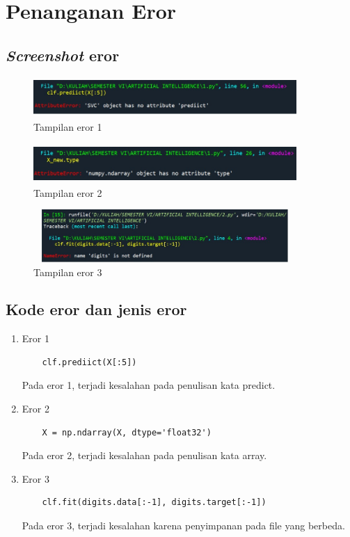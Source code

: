 \documentclass{article}
\begin{document}
\section{Penanganan Eror}
\subsection{\textit{Screenshot} eror}
    
    \begin{figure}[!htbp]
            \centering
            \includegraphics[width=10cm,height=1.5cm]{figures/1184101/chapter1/12.jpeg}
            \caption{Tampilan eror 1}
            \label{penanda}
            \end{figure}
            
    \begin{figure}[!htbp]
            \centering
            \includegraphics[width=10cm,height=1.5cm]{figures/1184101/chapter1/13.jpeg}
            \caption{Tampilan eror 2}
            \label{penanda}
            \end{figure}
            
    \begin{figure}[!htbp]
            \centering
            \includegraphics[width=10cm,height=2cm]{figures/1184101/chapter1/15.jpeg}
            \caption{Tampilan eror 3}
            \label{penanda}
            \end{figure}
            
\subsection{Kode eror dan jenis eror}
\begin{enumerate}
    \item Eror 1
\begin{verbatim}
    clf.prediict(X[:5])
\end{verbatim}
Pada eror 1, terjadi kesalahan pada penulisan kata predict.     \item Eror 2
\begin{verbatim}
    X = np.ndarray(X, dtype='float32')
\end{verbatim}
Pada eror 2, terjadi kesalahan pada penulisan kata array.
    \item Eror 3
\begin{verbatim}
    clf.fit(digits.data[:-1], digits.target[:-1])
\end{verbatim}
Pada eror 3, terjadi kesalahan karena penyimpanan pada file yang berbeda.
\end{enumerate}
\end{document}
